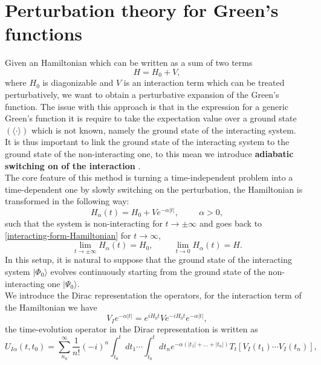 \documentclass[12pt, a4paper]{report}
\numberwithin{equation}{section}
\begin{document}
\section{Perturbation theory for Green's functions}
Given an Hamiltonian which can be written as a sum of two terms
\begin{equation}
    H=H_0+V,
    \label{interacting-form-Hamiltonian}
\end{equation}
where $H_0$ is diagonizable and $V$ is an interaction term which can be treated perturbatively, we want to obtain a perturbative expansion 
of the Green's function. The issue with this approach is that in the expression for a generic Green's function it is require to take the expectation value  
over a ground state $(\langle \cdot \rangle)$ which is not known, namely the ground state of the interacting system.\\
It is thus important to link the ground state of the interacting system to the ground state of the non-interacting one, to this mean we 
introduce \textbf{adiabatic switching on of the interaction} \cite{nolting2009fundamentals}.\\
The core feature of this method is turning a time-independent problem into a time-dependent one by slowly switching on the perturbation, the Hamiltonian 
is transformed in the following way:
\begin{equation}
    H_\alpha(t)=H_0+Ve^{-\alpha|t|},\hspace{1cm}\alpha>0,
\end{equation}
such that the system is non-interacting for $t\to\pm\infty$ and goes back to \ref{interacting-form-Hamiltonian} for $t\to\infty$,
\begin{equation}
    \lim_{t\to\pm\infty}H_\alpha(t)=H_0,\hspace{1cm}\lim_{t\to 0}H_\alpha(t)=H.
\end{equation}
In this setup, it is natural to suppose that the ground state of the interacting system $|\Phi_0\rangle$ evolves continuously starting from 
the ground state of the non-interacting one $|\Psi_0\rangle$.\\
We introduce the Dirac representation the operators, for the interaction term of the Hamiltonian we have
\begin{equation}
    V_{I}e^{-\alpha |t|} = e^{iH_0t}Ve^{-iH_0t}e^{-\alpha|t|},
\end{equation}
the time-evolution operator in the Dirac representation is written as
\begin{equation}
    U_{I\alpha}(t,t_0)=\sum_{n_0}^\infty \frac{1}{n!}(-i)^n \int_{t_0}^t dt_1\cdots\int_{t_0}^t dt_n e^{-\alpha(|t_1|+...+|t_n|)}T_t\left[V_I(t_1)\cdots V_I(t_n)\right],
    \label{t-evolution-perturbatively}
\end{equation}
\end{document}
